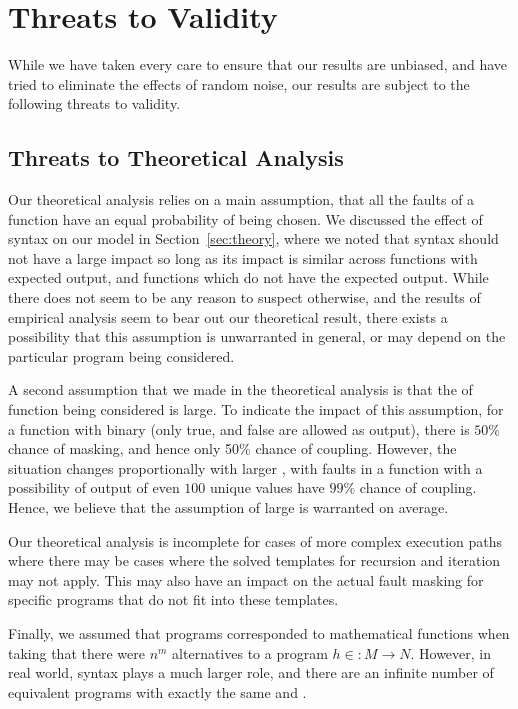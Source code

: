 \documentclass[preprint,nonatbib]{sigplanconf}\usepackage[]{graphicx}\usepackage[]{color}
\begin{document}

\section{Threats to Validity}
\label{sec:threats}

While we have taken every care to ensure that our results are unbiased, and
have tried to eliminate the effects of random noise, our results are subject
to the following threats to validity.

\subsection{Threats to Theoretical Analysis}
Our theoretical analysis relies on a main assumption, that all the faults of
a function have an equal probability of being chosen. We discussed the
effect of syntax on our model in Section~\ref{sec:theory}, where we noted
that syntax should not have a large impact so long as its impact is similar
across functions with expected output, and functions which do not have the
expected output. While there does not seem to be any reason to suspect
otherwise, and the results of empirical analysis seem to bear out our
theoretical result, there exists a possibility that this assumption is
unwarranted in general, or may depend on the particular program being
considered.

A second assumption that we made in the theoretical analysis is that the
\foutput of function being considered is large. To indicate the impact of
this assumption, for a function with binary \foutput (only true, and false are
allowed as output), there is $50\%$ chance of masking, and hence only 50\%
chance of coupling. However, the situation changes proportionally with
larger \foutput, with faults in a function with a possibility of output of even
$100$ unique values have $99\%$ chance of coupling. Hence,
we believe that the assumption of large \foutput is warranted on average.

Our theoretical analysis is incomplete for cases of more complex execution
paths where there may be cases where the solved templates for recursion and
iteration may not apply. This may also have an impact on the actual fault
masking for specific programs that do not fit into these templates.

Finally, we assumed that programs corresponded to mathematical functions when
taking that there were $n^m$ alternatives to a program $h \in : M \rightarrow N $.
However, in real world, syntax plays a much larger role, and there are
an infinite number of equivalent programs with exactly the same \finput and
\foutput.
\end{document}
